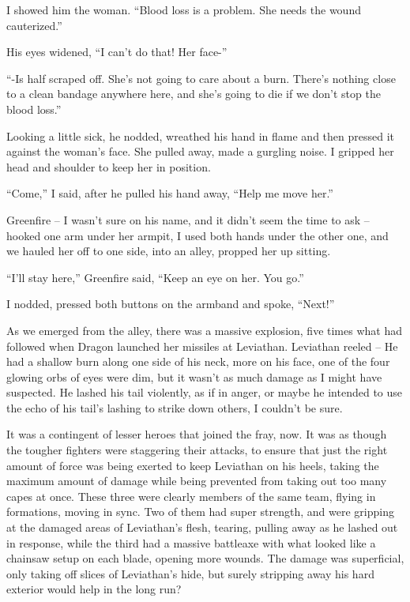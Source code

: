 I showed him the woman.  ``Blood loss is a problem.  She needs the wound cauterized.''



His eyes widened, ``I can't do that!  Her face-''



``-Is half scraped off.  She's not going to care about a burn.  There's nothing close to a clean bandage anywhere here, and she's going to die if we don't stop the blood loss.''



Looking a little sick, he nodded, wreathed his hand in flame and then pressed it against the woman's face.  She pulled away, made a gurgling noise.  I gripped her head and shoulder to keep her in position.



``Come,'' I said, after he pulled his hand away, ``Help me move her.''



Greenfire – I wasn't sure on his name, and it didn't seem the time to ask – hooked one arm under her armpit, I used both hands under the other one, and we hauled her off to one side, into an alley, propped her up sitting.



``I'll stay here,'' Greenfire said, ``Keep an eye on her.  You go.''



I nodded, pressed both buttons on the armband and spoke, ``Next!''



As we emerged from the alley, there was a massive explosion, five times what had followed when Dragon launched her missiles at Leviathan.  Leviathan reeled – He had a shallow burn along one side of his neck, more on his face, one of the four glowing orbs of eyes were dim, but it wasn't as much damage as I might have suspected.  He lashed his tail violently, as if in anger, or maybe he intended to use the echo of his tail's lashing to strike down others, I couldn't be sure.



It was a contingent of lesser heroes that joined the fray, now.  It was as though the tougher fighters were staggering their attacks, to ensure that just the right amount of force was being exerted to keep Leviathan on his heels, taking the maximum amount of damage while being prevented from taking out too many capes at once.  These three were clearly members of the same team, flying in formations, moving in sync.  Two of them had super strength, and were gripping at the damaged areas of Leviathan's flesh, tearing, pulling away as he lashed out in response, while the third had a massive battleaxe with what looked like a chainsaw setup on each blade, opening more wounds.  The damage was superficial, only taking off slices of Leviathan's hide, but surely stripping away his hard exterior would help in the long run?



